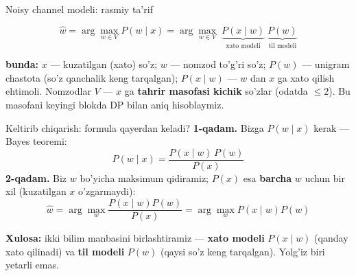 \documentclass[aspectratio=169,11pt]{beamer}
\newcommand{\bunda}[1]{{\small\textbf{bunda:}\; #1}}
\begin{document}
\begin{frame}{Noisy channel modeli: rasmiy ta'rif}
  \begin{tcolorbox}[defbox,title=Ta'rif: noisy channel imlo tuzatish]
    \vspace{-0.4em}
    $$ \hat{w} = \arg\max_{w \in V} P(w \mid x)
       = \arg\max_{w \in V} \; \underbrace{P(x \mid w)}_{\text{xato modeli}}\;
                                \underbrace{P(w)}_{\text{til modeli}} $$
  \end{tcolorbox}
  \vspace{2pt}
  \bunda{$x$ --- kuzatilgan (xato) so'z; $w$ --- nomzod to'g'ri so'z;
  $P(w)$ --- unigram chastota (so'z qanchalik keng tarqalgan);
  $P(x{\mid}w)$ --- $w$ dan $x$ ga xato qilish ehtimoli.}
  \vspace{4pt}
  \footnotesize
  Nomzodlar $V$ --- $x$ ga \textbf{tahrir masofasi kichik} so'zlar
  (odatda $\le 2$). Bu masofani keyingi blokda DP bilan aniq hisoblaymiz.
\end{frame}

\begin{frame}{Keltirib chiqarish: formula qayerdan keladi?}
  \textbf{1-qadam.} Bizga $P(w\mid x)$ kerak --- Bayes teoremi:
  $$ P(w \mid x) = \frac{P(x \mid w)\,P(w)}{P(x)} $$
  \pause
  \textbf{2-qadam.} Biz $w$ bo'yicha maksimum qidiramiz; $P(x)$ esa
  \textbf{barcha} $w$ uchun bir xil (kuzatilgan $x$ o'zgarmaydi):
  $$ \hat{w} = \arg\max_w \frac{P(x\mid w)P(w)}{P(x)}
            = \arg\max_w P(x\mid w)P(w) $$
  \pause
  \begin{tcolorbox}[okbox]
    \small \textbf{Xulosa:} ikki bilim manbasini birlashtiramiz ---
    \textbf{xato modeli} $P(x{\mid}w)$ (qanday xato qilinadi) va
    \textbf{til modeli} $P(w)$ (qaysi so'z keng tarqalgan). Yolg'iz
    biri yetarli emas.
  \end{tcolorbox}
\end{frame}
\end{document}
